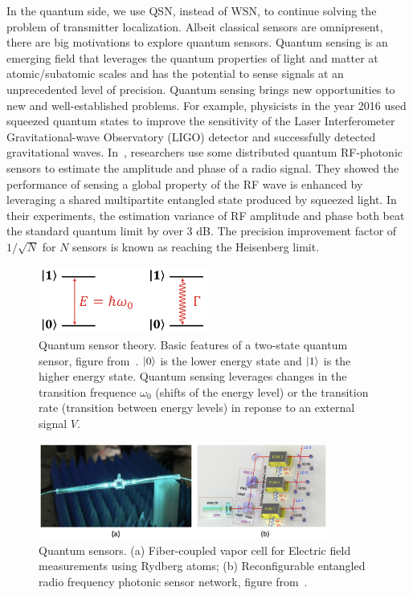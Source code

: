 In the quantum side, we use QSN, instead of WSN, to continue solving the problem of transmitter localization.
Albeit classical sensors are omnipresent, there are big motivations to explore quantum sensors.
Quantum sensing is an emerging field that leverages the quantum properties of light and matter at atomic/subatomic scales and has the potential to sense signals at an unprecedented level of precision.
Quantum sensing brings new opportunities to new and well-established problems.
For example, physicists in the year 2016 used squeezed quantum states to improve the sensitivity of the Laser Interferometer Gravitational-wave Observatory (LIGO) detector and successfully detected gravitational waves.
In~\cite{PRL20-qsn}, researchers use some distributed quantum RF-photonic sensors to estimate the amplitude and phase of a radio signal.
They showed the performance of sensing a global property of the RF wave is enhanced by leveraging a shared multipartite entangled state produced by squeezed light.
In their experiments, the estimation variance of RF amplitude and phase both beat the standard quantum limit by over 3 dB.
The precision improvement factor of $1/\sqrt{N}$ for $N$ sensors is known as reaching the Heisenberg limit.

\begin{figure}[t]
      \centering
      \includegraphics[width=0.5\textwidth]{figures/qsensor.png}
      \caption{Quantum sensor theory. Basic features of a two-state quantum sensor, figure from~\cite{RevModPhys.quantumsensing}.
               $\ket{0}$ is the lower energy state and $\ket{1}$ is the higher energy state. Quantum sensing leverages changes in the
               transition frequence $\omega_{0}$ (shifts of the energy level) or the transition rate (transition between energy levels) 
               in reponse to an external signal $V$.} 
      \label{fig:intro-qsensor}
\end{figure}

\begin{figure}[t]
      \centering
      \includegraphics[width=0.85\textwidth]{figures/qsensor2.png}
      \caption{Quantum sensors. (a) Fiber-coupled vapor cell for Electric field measurements using Rydberg atoms;
               (b) Reconfigurable entangled radio frequency photonic sensor network, figure from~\cite{PRL20-qsn}.} 
      \label{fig:intro-qsensor2}
\end{figure}

